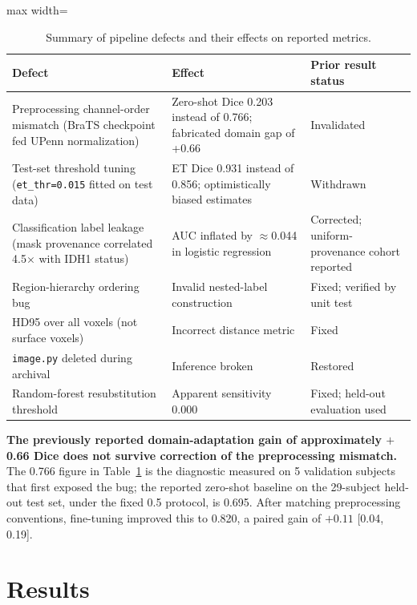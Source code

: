 \documentclass[conference]{IEEEtran}
\begin{document}
\begin{table}[!t]
\centering
\caption{Summary of pipeline defects and their effects on reported metrics.}
\label{tab:audit}
\begin{adjustbox}{max width=\columnwidth}
\begin{tabular}{p{2.8cm}p{2.5cm}p{2.5cm}}
\toprule
\textbf{Defect} & \textbf{Effect} & \textbf{Prior result status} \\
\midrule
Preprocessing channel-order mismatch (BraTS checkpoint fed UPenn normalization) & Zero-shot Dice 0.203 instead of 0.766; fabricated domain gap of +0.66 & Invalidated \\
\midrule
Test-set threshold tuning (\texttt{et\_thr=0.015} fitted on test data) & ET Dice 0.931 instead of 0.856; optimistically biased estimates & Withdrawn \\
\midrule
Classification label leakage (mask provenance correlated 4.5$\times$ with IDH1 status) & AUC inflated by $\approx$0.044 in logistic regression & Corrected; uniform-provenance cohort reported \\
\midrule
Region-hierarchy ordering bug & Invalid nested-label construction & Fixed; verified by unit test \\
\midrule
HD95 over all voxels (not surface voxels) & Incorrect distance metric & Fixed \\
\midrule
\texttt{image.py} deleted during archival & Inference broken & Restored \\
\midrule
Random-forest resubstitution threshold & Apparent sensitivity 0.000 & Fixed; held-out evaluation used \\
\bottomrule
\end{tabular}
\end{adjustbox}
\end{table}

\textbf{The previously reported domain-adaptation gain of approximately $+$0.66 Dice does not survive correction of the preprocessing mismatch.} The 0.766 figure in Table~\ref{tab:audit} is the diagnostic measured on 5 validation subjects that first exposed the bug; the reported zero-shot baseline on the 29-subject held-out test set, under the fixed 0.5 protocol, is 0.695. After matching preprocessing conventions, fine-tuning improved this to 0.820, a paired gain of $+0.11$ [0.04, 0.19].

\section{Results}
\label{sec:results}
\end{document}
